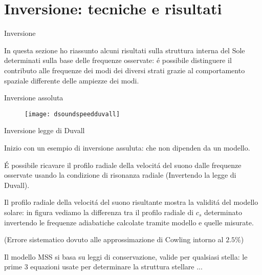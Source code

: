 \documentclass[10pt,xcolor={usenames},fleqn,mathserif,serif]{beamer}
\begin{document}
\part{Inversione: tecniche e risultati}\label{part:inverseproblem}

\frame{\partpage}

\begin{wordonframe}{Inversione}

In questa sezione ho riassunto alcuni risultati sulla struttura interna del Sole determinati sulla base delle frequenze osservate:
\'e possibile distinguere il contributo alle frequenze dei modi dei diversi strati grazie al comportamento spaziale differente delle ampiezze dei modi.

\end{wordonframe}

\begin{frame}{Inversione assoluta}


\begin{figure}[!ht]
\texttt{[image: dsoundspeedduvall]} 
\end{figure}

\end{frame}

\begin{wordonframe}{Inversione legge di Duvall}

Inizio con un esempio di inversione assuluta: che non dipenden da un modello.

\'E possibile ricavare il profilo radiale della velocit\'a del suono dalle frequenze osservate usando la condizione di risonanza radiale (Invertendo la legge di Duvall).

Il profilo radiale della velocit\'a del suono risultante  mostra la validit\'a del modello solare: in figura vediamo la differenza tra il profilo radiale di $c_s$ determinato invertendo le frequenze adiabatiche calcolate tramite modello e quelle misurate.

(Errore sistematico dovuto alle approssimazione di Cowling intorno al $2.5\%$)

Il modello MSS si basa su leggi di conservazione, valide per qualsiasi stella: le prime 3 equazioni usate per determinare la struttura stellare ...

\end{wordonframe}
\end{document}
